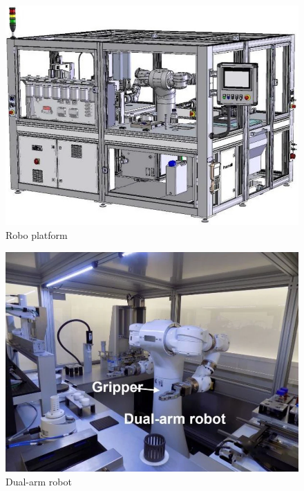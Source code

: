 \begin{figure}[H]
  \centering
  \includegraphics[scale=0.4]{figures/platform setup.png} %
  \caption{Robo platform}
  \label{fig:platform}
\end{figure}



\begin{figure}[H]
  \centering
  \includegraphics[scale=0.4]{figures/robot.png} %
  \caption{Dual-arm robot}
  \label{fig:Robot}
\end{figure}

